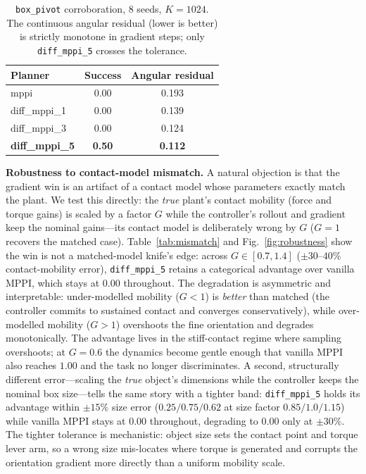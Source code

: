 \documentclass[journal]{IEEEtran}
\begin{document}
\begin{table}[t]
\centering
\caption{%
  \texttt{box\_pivot} corroboration, 8 seeds, $K\!=\!1024$. The continuous
  angular residual (lower is better) is strictly monotone in gradient steps;
  only \texttt{diff\_mppi\_5} crosses the tolerance.%
}
\label{tab:box_pivot}
\begin{tabular}{lcc}
\toprule
Planner & Success & Angular residual \\
\midrule
mppi          & 0.00 & 0.193 \\
diff\_mppi\_1 & 0.00 & 0.139 \\
diff\_mppi\_3 & 0.00 & 0.124 \\
\textbf{diff\_mppi\_5} & \textbf{0.50} & \textbf{0.112} \\
\bottomrule
\end{tabular}
\end{table}

\textbf{Robustness to contact-model mismatch.} A natural objection is that the
gradient win is an artifact of a contact model whose parameters exactly match the
plant. We test this directly: the \emph{true} plant's contact mobility (force and
torque gains) is scaled by a factor $G$ while the controller's rollout and
gradient keep the nominal gains---its contact model is deliberately wrong by $G$
($G\!=\!1$ recovers the matched case). Table~\ref{tab:mismatch} and
Fig.~\ref{fig:robustness} show the win is not a matched-model knife's edge: across $G \in [0.7, 1.4]$ ($\pm 30$--$40\%$
contact-mobility error), \texttt{diff\_mppi\_5} retains a categorical advantage
over vanilla MPPI, which stays at $0.00$ throughout. The degradation is
asymmetric and interpretable: under-modelled mobility ($G\!<\!1$) is \emph{better}
than matched (the controller commits to sustained contact and converges
conservatively), while over-modelled mobility ($G\!>\!1$) overshoots the fine
orientation and degrades monotonically. The advantage lives in the stiff-contact
regime where sampling overshoots; at $G\!=\!0.6$ the dynamics become gentle enough
that vanilla MPPI also reaches $1.00$ and the task no longer discriminates. A
second, structurally different error---scaling the \emph{true} object's
dimensions while the controller keeps the nominal box size---tells the same story
with a tighter band: \texttt{diff\_mppi\_5} holds its advantage within $\pm 15\%$
size error ($0.25/0.75/0.62$ at size factor $0.85/1.0/1.15$) while vanilla MPPI
stays at $0.00$ throughout, degrading to $0.00$ only at $\pm 30\%$. The tighter
tolerance is mechanistic: object size sets the contact point and torque lever
arm, so a wrong size mis-locates where torque is generated and corrupts the
orientation gradient more directly than a uniform mobility scale.
\end{document}
